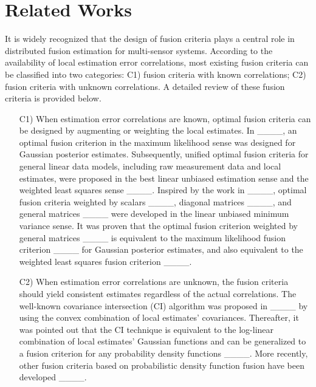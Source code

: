 \section{Related Works}
It is widely recognized that the design of fusion criteria plays a central role in distributed fusion estimation for multi-sensor systems. According to the availability of local estimation error correlations, most existing fusion criteria can be classified into two categories: C1) fusion criteria with known correlations; C2) fusion criteria with unknown correlations. A detailed review of these fusion criteria is provided below.
	\begin{itemize}
		\item[C1)] When estimation error correlations are known, optimal fusion criteria can be designed by augmenting or weighting the local estimates. In ____, an optimal fusion criterion in the maximum likelihood sense was designed for Gaussian posterior estimates. Subsequently, unified optimal fusion criteria for general linear data models, including raw measurement data and local estimates, were proposed in the best linear unbiased estimation sense and the weighted least squares sense ____. Inspired by the work in ____, optimal fusion criteria weighted by scalars ____, diagonal matrices ____, and general matrices ____ were developed in the linear unbiased minimum variance sense. It was proven that the optimal fusion criterion weighted by general matrices ____ is equivalent to the maximum likelihood fusion criterion ____ for Gaussian posterior estimates, and also equivalent to the weighted least squares fusion criterion ____.
		\item[C2)] When estimation error correlations are unknown, the fusion criteria should yield consistent estimates regardless of the actual correlations. The well-known covariance intersection (CI) algorithm was proposed in ____ by using the convex combination of local estimates' covariances. Thereafter, it was pointed out that the CI technique is equivalent to the log-linear combination of local estimates' Gaussian functions and can be generalized to a fusion criterion for any probability density functions ____. More recently, other fusion criteria based on probabilistic density function fusion have been developed ____.
	\end{itemize}
	
